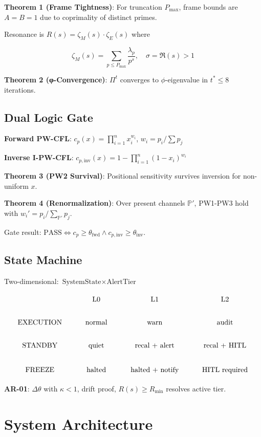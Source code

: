 \documentclass[11pt]{article}
\begin{document}
\textbf{Theorem 1 (Frame Tightness)}: For truncation $P_{\max}$, frame bounds are $A=B=1$ due to coprimality of distinct primes.

Resonance is $R(s) = \zeta_M(s) \cdot \zeta_E(s)$ where

\[
\zeta_M(s) = \sum_{p \le P_{\max}} \frac{\lambda_p}{p^s}, \quad \sigma = \Re(s) > 1
\]

\textbf{Theorem 2 (φ-Convergence)}: $\Pi^t$ converges to $\phi$-eigenvalue in $t^* \le 8$ iterations.

\subsection{Dual Logic Gate}

\textbf{Forward PW-CFL}: $c_p(x) = \prod_{i=1}^n x_i^{w_i}$, $w_i = p_i / \sum p_j$

\textbf{Inverse I-PW-CFL}: $c_{p,\text{inv}}(x) = 1 - \prod_{i=1}^n (1-x_i)^{w_i}$

\textbf{Theorem 3 (PW2 Survival)}: Positional sensitivity survives inversion for non-uniform $x$.

\textbf{Theorem 4 (Renormalization)}: Over present channels $\mathbb{P}'$, PW1-PW3 hold with $w_i' = p_i / \sum_{\mathbb{P}'} p_j$.

Gate result: $\text{PASS} \iff c_p \ge \theta_{\text{fwd}} \land c_{p,\text{inv}} \ge \theta_{\text{inv}}$.

\subsection{State Machine}

Two-dimensional: $\text{SystemState} \times \text{AlertTier}$

\[
\begin{tikzcd}
& \text{L0} & \text{L1} & \text{L2} \\
\text{EXECUTION} & \text{normal} & \text{warn} & \text{audit} \\
\text{STANDBY} & \text{quiet} & \text{recal + alert} & \text{recal + HITL} \\
\text{FREEZE} & \text{halted} & \text{halted + notify} & \text{HITL required}
\end{tikzcd}
\]

\textbf{AR-01}: $\Delta\theta$ with $\kappa < 1$, drift proof, $R(s) \ge R_{\min}$ resolves active tier.

\section{System Architecture}
\end{document}
